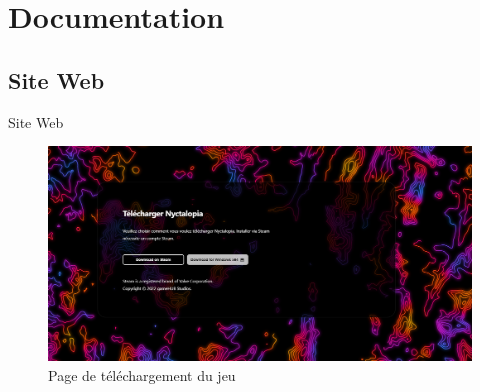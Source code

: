 \section{Documentation}

\subsection{Site Web}
\begin{frame}{Site Web}

\begin{figure}[H]
\centering
  \centering
  \includegraphics[width=.7\linewidth]{img/load.PNG}
  \caption{Page de téléchargement du jeu}
  \label{fig:houses}
\end{figure}

\end{frame}

